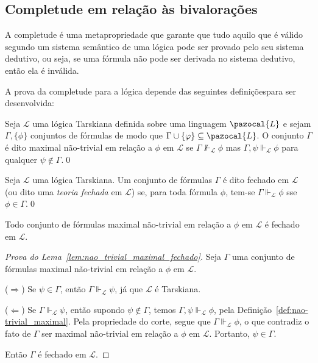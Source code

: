     \subsection{Completude em relação às bivalorações}\label{sec:comp}
        A completude é uma metapropriedade que garante que tudo aquilo que é válido segundo um sistema semântico de uma lógica pode ser provado pelo seu sistema dedutivo, ou seja, se uma fórmula não pode ser derivada no sistema dedutivo, então ela é inválida.

        A prova da completude para a lógica \lfium{} depende das seguintes definiçõespara ser desenvolvida:

        \begin{definicao}\label{def:nao-trivial_maximal}
            Seja $\mathcal{L}$ uma lógica Tarskiana definida sobre uma linguagem $\pazocal{L}$ e sejam $\Gamma, \{\phi\}$ conjuntos de fórmulas de modo que $\Gamma \cup \{\phi\} \subseteq \pazocal{L}$. O conjunto $\Gamma$ é dito maximal não-trivial em relação a $\phi$ em $\mathcal{L}$ se $\Gamma \nVdash_{\mathcal{L}} \phi$ mas $\Gamma, \psi \Vdash_{\mathcal{L}} \phi$ para qualquer $\psi \notin \Gamma$.\qed{}
        \end{definicao}

        \begin{definicao}\label{def:fechada}

            Seja $\mathcal{L}$ uma lógica Tarskiana. Um conjunto de fórmulas $\Gamma$ é dito fechado em $\mathcal{L}$ (ou dito uma \textit{teoria fechada} em $\mathcal{L}$) se, para toda fórmula $\phi$, tem-se $\Gamma \Vdash_{\mathcal{L}} \phi$ sse $\phi \in \Gamma$.\qed{}
        \end{definicao}

        \begin{lema}\label{lem:nao_trivial_maximal_fechado}
            Todo conjunto de fórmulas maximal não-trivial em relação a $\phi$ em $\mathcal{L}$ é fechado em $\mathcal{L}$.
        \end{lema}

        \begin{proof}[Prova do Lema~\ref{lem:nao_trivial_maximal_fechado}]
            Seja $\Gamma$ uma conjunto de fórmulas maximal não-trivial em relação a $\phi$ em $\mathcal{L}$. 
            
            \noindent($\Longrightarrow$) Se $\psi \in \Gamma$, então $\Gamma \Vdash_{\mathcal{L}} \psi$, já que $\mathcal{L}$ é Tarskiana. 
            
            \noindent($\Longleftarrow$) Se $\Gamma \Vdash_{\mathcal{L}} \psi$, então supondo $\psi \notin \Gamma$, temos $\Gamma, \psi \Vdash_{\mathcal{L}} \phi$, pela Definição~\ref{def:nao-trivial_maximal}. Pela propriedade do corte, segue que $\Gamma \Vdash_{\mathcal{L}} \phi$, o que contradiz o fato de $\Gamma$ ser maximal não-trivial em relação a $\phi$ em $\mathcal{L}$. Portanto, $\psi \in \Gamma$.
            
            Então $\Gamma$ é fechado em $\mathcal{L}$.
        \end{proof}

